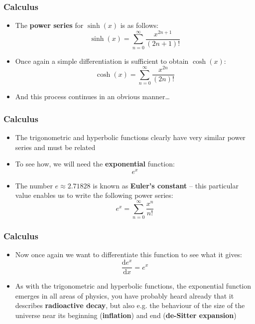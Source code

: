 \documentclass{beamer}
\begin{document}
\begin{frame}
  \frametitle{Calculus}
  \begin{itemize}
    \item<1-> The \textbf{power series} for $\sinh(x)$ is as follows:
      \begin{equation*}
	\sinh(x)=\sum_{n=0}^{\infty}\frac{x^{2n+1}}{(2n+1)!}
	\label{<+label+>}
      \end{equation*}
    \item<2-> Once again a simple differentiation is sufficient to obtain $\cosh(x)$:
      \begin{equation*}
	\cosh(x)=\sum_{n=0}^{\infty}\frac{x^{2n}}{(2n)!}
	\label{<+label+>}
      \end{equation*}
    \item<3-> And this process continues in an obvious manner\ldots
  \end{itemize}
\end{frame}

\begin{frame}
  \frametitle{Calculus}
  \begin{itemize}
    \item<1-> The trigonometric and hyperbolic functions clearly have very similar power series and must be related
    \item<2-> To see how, we will need the \textbf{exponential} function:
      \begin{equation*}
	e^x
      \end{equation*}
    \item<3-> The number $e\approx 2.71828$ is known as \textbf{Euler's constant} -- this particular value enables us to write the following power series:
      \begin{equation*}
	e^x=\sum_{n=0}^{\infty}\frac{x^n}{n!}
      \end{equation*}
  \end{itemize}
\end{frame}

\begin{frame}
  \frametitle{Calculus}
  \begin{itemize}
    \item<1-> Now once again we want to differentiate this function to see what it gives:
      \begin{equation*}
	\frac{\mathrm{d}e^x}{\mathrm{d}x}=e^x
      \end{equation*}
    \item<2-> As with the trigonometric and hyperbolic functions, the exponential function emerges in all areas of physics, you have probably heard already that it describes \textbf{radioactive decay}, but also e.g. the behaviour of the size of the universe near its beginning (\textbf{inflation}) and end (\textbf{de-Sitter expansion})
  \end{itemize}
\end{frame}
\end{document}
